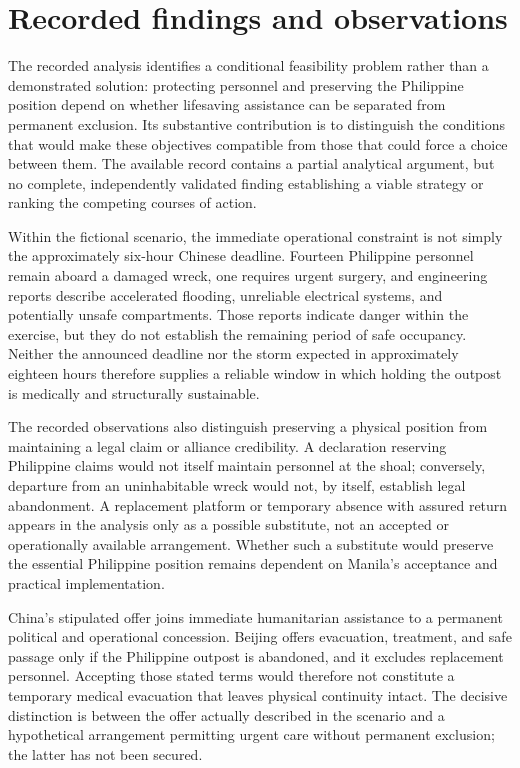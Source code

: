 \documentclass[11pt]{article}
\begin{document}
\section{Recorded findings and observations}
The recorded analysis identifies a conditional feasibility problem rather than a demonstrated solution: protecting personnel and preserving the Philippine position depend on whether lifesaving assistance can be separated from permanent exclusion. Its substantive contribution is to distinguish the conditions that would make these objectives compatible from those that could force a choice between them. The available record contains a partial analytical argument, but no complete, independently validated finding establishing a viable strategy or ranking the competing courses of action.

Within the fictional scenario, the immediate operational constraint is not simply the approximately six-hour Chinese deadline. Fourteen Philippine personnel remain aboard a damaged wreck, one requires urgent surgery, and engineering reports describe accelerated flooding, unreliable electrical systems, and potentially unsafe compartments. Those reports indicate danger within the exercise, but they do not establish the remaining period of safe occupancy. Neither the announced deadline nor the storm expected in approximately eighteen hours therefore supplies a reliable window in which holding the outpost is medically and structurally sustainable.

The recorded observations also distinguish preserving a physical position from maintaining a legal claim or alliance credibility. A declaration reserving Philippine claims would not itself maintain personnel at the shoal; conversely, departure from an uninhabitable wreck would not, by itself, establish legal abandonment. A replacement platform or temporary absence with assured return appears in the analysis only as a possible substitute, not an accepted or operationally available arrangement. Whether such a substitute would preserve the essential Philippine position remains dependent on Manila’s acceptance and practical implementation.

China’s stipulated offer joins immediate humanitarian assistance to a permanent political and operational concession. Beijing offers evacuation, treatment, and safe passage only if the Philippine outpost is abandoned, and it excludes replacement personnel. Accepting those stated terms would therefore not constitute a temporary medical evacuation that leaves physical continuity intact. The decisive distinction is between the offer actually described in the scenario and a hypothetical arrangement permitting urgent care without permanent exclusion; the latter has not been secured.
\end{document}
